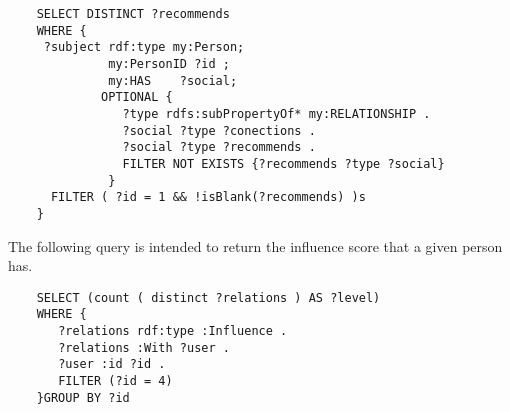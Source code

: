 \begin{verbatim}
    SELECT DISTINCT ?recommends
    WHERE {
     ?subject rdf:type my:Person;
              my:PersonID ?id ;
              my:HAS	?social;
             OPTIONAL {
                ?type rdfs:subPropertyOf* my:RELATIONSHIP .
                ?social ?type ?conections .
                ?social	?type ?recommends .
                FILTER NOT EXISTS {?recommends ?type ?social}
              } 
      FILTER ( ?id = 1 && !isBlank(?recommends) )s
    }
\end{verbatim}





The following query is intended to return the influence score that a given person has.

\begin{verbatim}
    SELECT (count ( distinct ?relations ) AS ?level)
    WHERE {
       ?relations rdf:type :Influence .
       ?relations :With ?user .
       ?user :id ?id .
       FILTER (?id = 4)
    }GROUP BY ?id
\end{verbatim}



